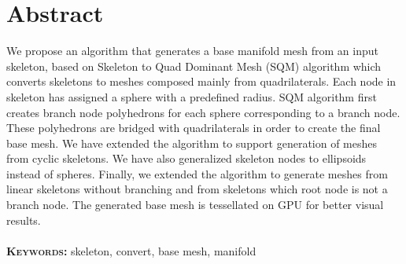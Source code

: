 \chapter{Abstract}
We propose an algorithm that generates a base manifold mesh from an input skeleton, based on Skeleton to Quad Dominant Mesh (SQM) algorithm which converts skeletons to meshes composed mainly from quadrilaterals.
Each node in skeleton has assigned a sphere with a predefined radius.
SQM algorithm first creates branch node polyhedrons for each sphere corresponding to a branch node.
These polyhedrons are bridged with quadrilaterals in order to create the final base mesh.
We have extended the algorithm to support generation of meshes from cyclic skeletons.
We have also generalized skeleton nodes to ellipsoids instead of spheres.
Finally, we extended the algorithm to generate meshes from linear skeletons without branching and from skeletons which root node is not a branch node.
The generated base mesh is tessellated on GPU for better visual results.
\\ \\
\textbf{\textsc{Keywords:}} skeleton, convert, base mesh, manifold
